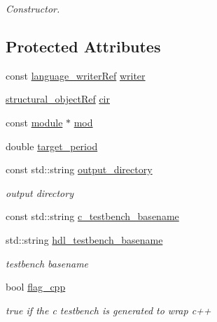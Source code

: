 \begin{DoxyCompactItemize}
\begin{DoxyCompactList}\small\item\em Constructor. \end{DoxyCompactList}\end{DoxyCompactItemize}
\subsection*{Protected Attributes}
\begin{DoxyCompactItemize}
\item 
const \hyperlink{language__writer_8hpp_ab5bb59a651cbff3f3c83b0f51c0b0b71}{language\+\_\+writer\+Ref} \hyperlink{classTestbenchGenerationBaseStep_ad97989bb73a7115bb0f7bdffbe822401}{writer}
\item 
\hyperlink{structural__objects_8hpp_a8ea5f8cc50ab8f4c31e2751074ff60b2}{structural\+\_\+object\+Ref} \hyperlink{classTestbenchGenerationBaseStep_a5b4a2578b7e7e6a70f5900082ab08279}{cir}
\item 
const \hyperlink{classmodule}{module} $\ast$ \hyperlink{classTestbenchGenerationBaseStep_af2cbe4fd4b1504c0660990a10beb3ada}{mod}
\item 
double \hyperlink{classTestbenchGenerationBaseStep_a4f6f2fe4bbfc5fdc2aaada0434a30fe8}{target\+\_\+period}
\item 
const std\+::string \hyperlink{classTestbenchGenerationBaseStep_a7c4ae628715dcac874fc3c500d604c80}{output\+\_\+directory}
\begin{DoxyCompactList}\small\item\em output directory \end{DoxyCompactList}\item 
const std\+::string \hyperlink{classTestbenchGenerationBaseStep_af264e2da91d4dd727725ea5d6b3136c1}{c\+\_\+testbench\+\_\+basename}
\item 
std\+::string \hyperlink{classTestbenchGenerationBaseStep_ae28d8f98adb06069807a29b7340b508c}{hdl\+\_\+testbench\+\_\+basename}
\begin{DoxyCompactList}\small\item\em testbench basename \end{DoxyCompactList}\item 
bool \hyperlink{classTestbenchGenerationBaseStep_a4644a66d06768013141bb2d4b6830b59}{flag\+\_\+cpp}
\begin{DoxyCompactList}\small\item\em true if the c testbench is generated to wrap c++ \end{DoxyCompactList}\end{DoxyCompactItemize}
